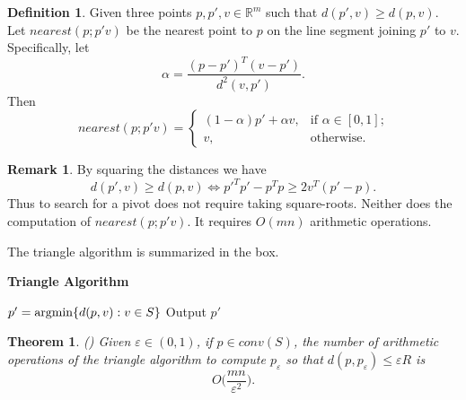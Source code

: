\documentclass{article}
\newtheorem{thm}{Theorem}
\theoremstyle{definition}
\newtheorem{definition}{Definition}
\newtheorem{remark}{Remark}
\begin{document}
\begin{definition} Given three points $p,p',v \in \mathbb{R}^m$ such that $d(p',v) \geq d(p,v)$. Let $nearest(p; p'v)$ be the nearest point to $p$ on the line segment joining  $p'$ to $v$. Specifically, let
\begin{equation}
\alpha = \frac{(p-p')^T(v-p')}{d^2(v, p')}.
\end{equation}
Then
\begin{equation} \label{pdp}
nearest(p; p'v)=
\begin{cases}
(1-\alpha)p' + \alpha v, &\text{if $\alpha \in [0,1]$;}\\
v, &\text{otherwise.}
\end{cases}
\end{equation}
\end{definition}

\begin{remark}
By squaring the distances we have
\begin{equation}
d(p',v) \geq d(p,v) \iff  p'^Tp' - p^Tp \geq 2v^T(p'-p).
\end{equation}
Thus to search for a pivot does not require taking square-roots.
Neither does the computation of $nearest(p;p'v)$. It requires $O(mn)$ arithmetic operations.
\end{remark}
The triangle algorithm is summarized in the box.

\begin{algorithm}[htpb]
{\bf Triangle Algorithm}\

 $p'={\rm argmin}\{d(p,v): v \in S\}$\;
 Output $p'$\;
\end{algorithm}


\begin{thm}  \label{thm3} {\rm (\cite{kal14})} Given $\varepsilon \in (0,1)$, if $p \in conv(S)$, the number of arithmetic operations of the triangle algorithm to compute $p_\varepsilon$ so that $d(p, p_\varepsilon) \leq \varepsilon R$ is
$$O\bigg (\frac{mn}{\varepsilon^2} \bigg ).$$
\end{thm}
\end{document}
